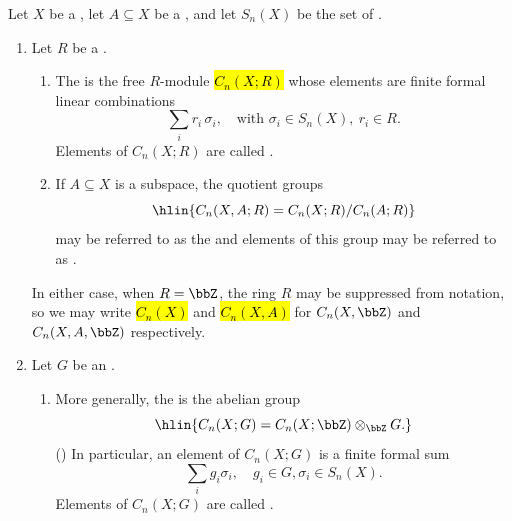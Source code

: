 \begin{definition} \label{definition:singular_chain_group_of_a_topological_space_with_ceofficients_in_an_abelian_group}
Let $X$ be a , let $A \subseteq X$ be a , and let $S_n(X)$ be the set of . 
\begin{enumerate}
    \item Let $R$ be a .  

    \begin{enumerate}
        \item The  is the free $R$-module \hl{$C_n(X;R)$} whose elements are finite formal linear combinations
        $$\sum_i r_i\, \sigma_i, \quad \text{with } \sigma_i \in S_n(X), \ r_i \in R.$$
        Elements of $C_n(X;R)$ are called .

        \item If $A \subseteq X$ is a subspace, the quotient groups
        $$\hlin{C_n(X,A;R) = C_n(X;R)/C_n(A;R)}$$
        may be referred to as the  and elements of this group may be referred to as .
    \end{enumerate}
    In either case, when $R = \bbZ$, the ring $R$ may be suppressed from notation, so we may write \hl{$C_n(X)$} and \hl{$C_n(X,A)$} for $C_n(X,\bbZ)$ and $C_n(X,A,\bbZ)$ respectively.

    \item Let $G$ be an . 
    \begin{enumerate}
        \item More generally, the  is the abelian group 
        $$\hlin{C_n(X;G) = C_n(X; \bbZ) \otimes_\bbZ G.}$$
        ()
        In particular, an element of $C_n(X;G)$ is a finite formal sum
        $$\sum_i g_i \sigma_i , \quad g_i \in G, \sigma_i \in S_n(X).$$
        Elements of $C_n(X;G)$ are called .


\end{enumerate}
\end{enumerate}
\end{definition}
